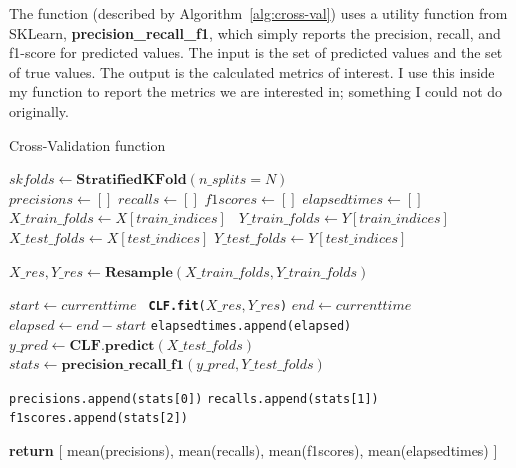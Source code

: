 \documentclass[12pt,a4paper,twoside]{report}
\begin{document}
The function (described by Algorithm~\ref{alg:cross-val}) uses a utility function from SKLearn, \textbf{precision\_recall\_f1}, which simply reports the precision, recall, and f1-score for predicted values. The input is the set of predicted values and the set of true values. The output is the calculated metrics of interest. I use this inside my function to report the metrics we are interested in; something I could not do originally. 

\begin{algorithm}[!htbp]
\caption{Cross-Validation function }\label{alg:cross-val}
\begin{algorithmic}[1]

   \State $skfolds\gets \textbf{StratifiedKFold}(n\_splits = N)$\\
   
   \State $precisions\gets []$
   \State $recalls\gets []$
   \State $f1scores\gets []$
   \State $elapsedtimes\gets []$\\
   
        \State
         \texttt{\State $X\_train\_folds\gets X[train\_indices]$}
        \texttt{ \State $Y\_train\_folds\gets Y[train\_indices]$}
        \texttt{ \State $X\_test\_folds\gets X[test\_indices]$}
         \texttt{\State $Y\_test\_folds\gets Y[test\_indices]$}
         
         \texttt{\State $X\_res, Y\_res \gets \textbf{Resample}(X\_train\_folds,Y\_train\_folds)$}
         
          \texttt{\State $ start \gets current time$} 
          \texttt{ \State \textbf{CLF.fit}($X\_res, Y\_res$)} 
          \texttt{\State $ end \gets current time$} 
          \texttt{\State $ elapsed \gets end - start$} 
          \texttt{\State elapsedtimes.append(elapsed)} 
           \texttt{\State $y\_pred \gets \textbf{CLF.predict}(X\_test\_folds)$} 
          \texttt{\State $stats \gets \textbf{precision\_recall\_f1}(y\_pred, Y\_test\_folds )$} 
          
          \texttt{\State precisions.append(stats[0])}
          \texttt{\State recalls.append(stats[1])}  
          \texttt{\State f1scores.append(stats[2])} 
   \EndFor
   
   \State \textbf{return} [ mean(precisions), mean(recalls), mean(f1scores), mean(elapsedtimes) ]
   
\EndProcedure
\end{algorithmic}
\end{algorithm}
\end{document}
